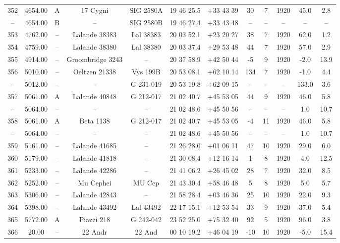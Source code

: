 \begin{table}
\begin{tabular}{cccccccccccc}
352 & 4654.00 & A & 17 Cygni & SIG 2580A & 19 46 25.5 & +33 43 39 & 30 & 7 & 1920 & 45.0 & 2.8 \\
-- & 4654.00 & B & -- & SIG 2580B & 19 46 27.4 & +33 43 48 & -- & -- & -- & -- & -- \\
353 & 4762.00 & -- & Lalande 38383 & Lal 38383 & 20 03 52.1 & +23 20 27 & 38 & 7 & 1920 & 62.0 & 1.2 \\
354 & 4759.00 & -- & Lalande 38380 & Lal 38380 & 20 03 37.4 & +29 53 48 & 44 & 7 & 1920 & 57.0 & 2.9 \\
355 & 4914.00 & -- & Groombridge 3243 & -- & 20 37 58.9 & +42 50 44 & -5 & 9 & 1920 & -2.0 & 13.9 \\
356 & 5010.00 & -- & Oeltzen 21338 & Vys 199B & 20 53 08.1 & +62 10 14 & 134 & 7 & 1920 & -1.0 & 4.4 \\
-- & 5012.00 & -- & -- & G 231-019 & 20 53 19.8 & +62 09 15 & -- & -- & -- & 133.0 & 3.6 \\
357 & 5061.00 & A & Lalande 40848 & G 212-017 & 21 02 40.7 & +45 53 05 & 44 & 9 & 1920 & 46.0 & 5.8 \\
-- & 5064.00 & -- & -- & -- & 21 02 48.6 & +45 50 56 & -- & -- & -- & 1.0 & 10.7 \\
358 & 5061.00 & A & Beta 1138 & G 212-017 & 21 02 40.7 & +45 53 05 & -4 & 11 & 1920 & 46.0 & 5.8 \\
-- & 5064.00 & -- & -- & -- & 21 02 48.6 & +45 50 56 & -- & -- & -- & 1.0 & 10.7 \\
359 & 5161.00 & -- & Lalande 41685 & -- & 21 26 28.0 & +01 06 11 & 47 & 10 & 1920 & 29.0 & 6.0 \\
360 & 5179.00 & -- & Lalande 41818 & -- & 21 30 08.4 & +12 16 14 & 1 & 8 & 1920 & 4.0 & 12.5 \\
361 & 5233.00 & -- & Lalande 42286 & -- & 21 41 06.2 & +26 45 02 & 28 & 7 & 1920 & 32.0 & 8.5 \\
362 & 5252.00 & -- & Mu Cephei & MU Cep & 21 43 30.4 & +58 46 48 & 5 & 8 & 1920 & 5.0 & 5.7 \\
363 & 5306.00 & -- & Lalande 42843 & -- & 21 58 28.4 & +03 46 36 & 25 & 10 & 1920 & 22.0 & 9.3 \\
364 & 5398.00 & -- & Lalande 43492 & Lal 43492 & 22 17 15.1 & +12 53 54 & 33 & 9 & 1920 & 37.0 & 5.4 \\
365 & 5772.00 & A & Piazzi 218 & G 242-042 & 23 52 25.0 & +75 32 40 & 92 & 5 & 1920 & 96.0 & 3.8 \\
366 & 20.00 & -- & 22 Andr & 22 And & 00 10 19.2 & +46 04 19 & -10 & 10 & 1920 & -5.0 & 15.4 \\

\end{tabular}
\end{table}
